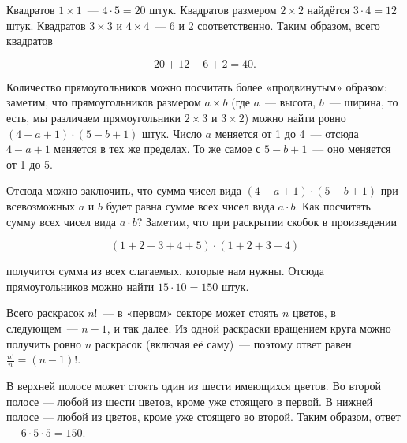 \begin{itemize}
\itA Квадратов $1 \times 1$~— $4 \cdot 5 = 20$ штук. Квадратов размером $2 \times 2$ найдётся $3 \cdot 4 = 12$ штук. Квадратов $3 \times 3$ и $4 \times 4$~— 6 и 2 соответственно. Таким образом, всего квадратов

$$20 + 12 + 6 + 2 = 40.$$

Количество прямоугольников можно посчитать более «продвинутым» образом: заметим, что прямоугольников размером $a \times b$ (где $a$~— высота, $b$~— ширина, то есть, мы различаем прямоугольники $2 \times 3$ и $3 \times 2$) можно найти ровно $(4-a+1) \cdot (5-b+1)$ штук. Число $a$ меняется от 1 до 4~— отсюда $4-a+1$ меняется в тех же пределах. То же самое с $5-b+1$~— оно меняется от 1 до 5.

\ms Отсюда можно заключить, что сумма чисел вида $(4-a+1) \cdot (5-b+1)$ при всевозможных $a$ и $b$ будет равна сумме всех чисел вида $a \cdot b$. Как посчитать сумму всех чисел вида $a \cdot b$? Заметим, что при раскрытии скобок в произведении

$$(1+2+3+4+5) \cdot (1+2+3+4)$$

получится сумма из всех слагаемых, которые нам нужны. Отсюда прямоугольников можно найти $15 \cdot 10 = 150$ штук.

\itB Всего раскрасок $n!$~— в «первом» секторе может стоять $n$ цветов, в следующем~— $n-1$, и так далее. Из одной раскраски вращением круга можно получить ровно $n$ раскрасок (включая её саму)~— поэтому ответ равен $\tfrac{n!}{n} = (n-1)!$.

\itC В верхней полосе может стоять один из шести имеющихся цветов. Во второй полосе — любой из шести цветов, кроме уже стоящего в первой. В нижней полосе — любой из цветов, кроме уже стоящего во второй. Таким образом, ответ — $6 \cdot 5 \cdot 5 = 150$.
\end{itemize}